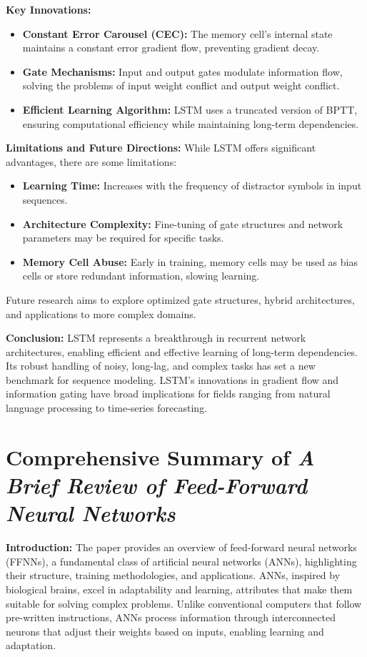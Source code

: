 \textbf{Key Innovations:}
\begin{itemize}
    \item \textbf{Constant Error Carousel (CEC):} The memory cell's internal state maintains a constant error gradient flow, preventing gradient decay.
    \item \textbf{Gate Mechanisms:} Input and output gates modulate information flow, solving the problems of input weight conflict and output weight conflict.
    \item \textbf{Efficient Learning Algorithm:} LSTM uses a truncated version of BPTT, ensuring computational efficiency while maintaining long-term dependencies.
\end{itemize}

\textbf{Limitations and Future Directions:} While LSTM offers significant advantages, there are some limitations:
\begin{itemize}
    \item \textbf{Learning Time:} Increases with the frequency of distractor symbols in input sequences.
    \item \textbf{Architecture Complexity:} Fine-tuning of gate structures and network parameters may be required for specific tasks.
    \item \textbf{Memory Cell Abuse:} Early in training, memory cells may be used as bias cells or store redundant information, slowing learning.
\end{itemize}
Future research aims to explore optimized gate structures, hybrid architectures, and applications to more complex domains.

\textbf{Conclusion:} LSTM represents a breakthrough in recurrent network architectures, enabling efficient and effective learning of long-term dependencies. Its robust handling of noisy, long-lag, and complex tasks has set a new benchmark for sequence modeling. LSTM's innovations in gradient flow and information gating have broad implications for fields ranging from natural language processing to time-series forecasting.


\section*{Comprehensive Summary of \textit{A Brief Review of Feed-Forward Neural Networks}}

\textbf{Introduction:} The paper provides an overview of feed-forward neural networks (FFNNs), a fundamental class of artificial neural networks (ANNs), highlighting their structure, training methodologies, and applications. ANNs, inspired by biological brains, excel in adaptability and learning, attributes that make them suitable for solving complex problems. Unlike conventional computers that follow pre-written instructions, ANNs process information through interconnected neurons that adjust their weights based on inputs, enabling learning and adaptation.

